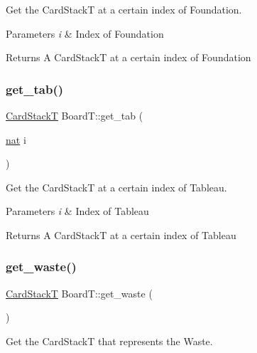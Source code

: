 Get the Card\+StackT at a certain index of Foundation. 


\begin{DoxyParams}{Parameters}
{\em i} & Index of Foundation \\
\hline
\end{DoxyParams}
\begin{DoxyReturn}{Returns}
A Card\+StackT at a certain index of Foundation 
\end{DoxyReturn}
\mbox{\label{class_board_t_a5cadb578ee4cf95b8fe10b63c08e6041}} 
\subsubsection{\texorpdfstring{get\+\_\+tab()}{get\_tab()}}
{\footnotesize\ttfamily \hyperlink{class_stack}{Card\+StackT} Board\+T\+::get\+\_\+tab (\begin{DoxyParamCaption}\item[{\hyperlink{_card_types_8h_a56638ee9d162e8cce3a15f92d2023d6e}{nat}}]{i }\end{DoxyParamCaption})}



Get the Card\+StackT at a certain index of Tableau. 


\begin{DoxyParams}{Parameters}
{\em i} & Index of Tableau \\
\hline
\end{DoxyParams}
\begin{DoxyReturn}{Returns}
A Card\+StackT at a certain index of Tableau 
\end{DoxyReturn}
\mbox{\label{class_board_t_a1e3a7edd2e993d22a453da1487177585}} 
\subsubsection{\texorpdfstring{get\+\_\+waste()}{get\_waste()}}
{\footnotesize\ttfamily \hyperlink{class_stack}{Card\+StackT} Board\+T\+::get\+\_\+waste (\begin{DoxyParamCaption}{ }\end{DoxyParamCaption})}



Get the Card\+StackT that represents the Waste. 


